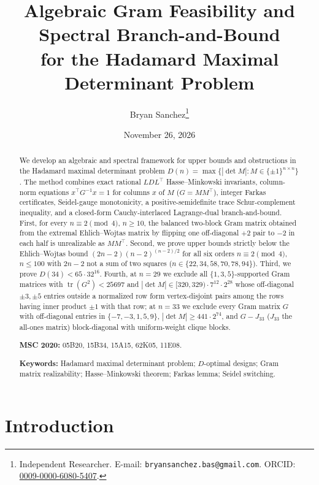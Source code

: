 \documentclass[11pt]{article}
\title{\textbf{Algebraic Gram Feasibility and Spectral Branch-and-Bound\\
for the Hadamard Maximal Determinant Problem}}
\author{%
  Bryan Sanchez\thanks{%
    Independent Researcher.
    E-mail: \texttt{bryansanchez.bas@gmail.com}.
    ORCID: \href{https://orcid.org/0009-0000-6080-5407}{0009-0000-6080-5407}.}
}
\date{November 26, 2026}
\theoremstyle{remark}
\newcommand{\tr}{\operatorname{tr}}
\begin{document}
\maketitle

\begin{abstract}
We develop an algebraic and spectral framework for upper bounds and obstructions in the Hadamard maximal determinant problem $D(n)=\max\{|\det M|:M\in\{\pm 1\}^{n\times n}\}$. The method combines exact rational $LDL^\top$ Hasse--Minkowski invariants, column-norm equations $x^\top G^{-1} x = 1$ for columns $x$ of $M$ ($G = M M^\top$), integer Farkas certificates, Seidel-gauge monotonicity, a positive-semidefinite trace Schur-complement inequality, and a closed-form Cauchy-interlaced Lagrange-dual branch-and-bound. First, for every $n \equiv 2 \pmod 4$, $n \ge 10$, the balanced two-block Gram matrix obtained from the extremal Ehlich--Wojtas matrix by flipping one off-diagonal $+2$ pair to $-2$ in each half is unrealizable as $M M^\top$. Second, we prove upper bounds strictly below the Ehlich--Wojtas bound $(2n-2)(n-2)^{(n-2)/2}$ for all six orders $n \equiv 2 \pmod 4$, $n \le 100$ with $2n-2$ not a sum of two squares ($n\in\{22,34,58,70,78,94\}$). Third, we prove $D(34) < 65 \cdot 32^{16}$. Fourth, at $n = 29$ we exclude all $\{1,3,5\}$-supported Gram matrices with $\tr(G^2) < 25697$ and $|\det M| \in [320,329)\cdot 7^{12}\cdot 2^{28}$ whose off-diagonal $\pm 3, \pm 5$ entries outside a normalized row form vertex-disjoint pairs among the rows having inner product $\pm 1$ with that row; at $n = 33$ we exclude every Gram matrix $G$ with off-diagonal entries in $\{-7,-3,1,5,9\}$, $|\det M| \ge 441 \cdot 2^{74}$, and $G - J_{33}$ ($J_{33}$ the all-ones matrix) block-diagonal with uniform-weight clique blocks.

\medskip
\noindent\textbf{MSC 2020:} 05B20, 15B34, 15A15, 62K05, 11E08.

\noindent\textbf{Keywords:} Hadamard maximal determinant problem; $D$-optimal designs; Gram matrix realizability; Hasse--Minkowski theorem; Farkas lemma; Seidel switching.
\end{abstract}

\section{Introduction}\label{sec:intro}
\end{document}
